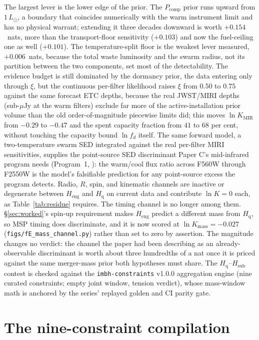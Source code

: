 \documentclass[11pt]{article}
\newcommand{\lnK}{\ensuremath{\ln K}}
\newcommand{\Heng}{\ensuremath{H_{\mathrm{eng}}}}
\newcommand{\Hgas}{\ensuremath{H_{\mathrm{q}}}}
\newcommand{\Hsub}{\ensuremath{H_{\mathrm{sub}}}}
\begin{document}
The largest lever is the lower edge of the prior. The $P_{\mathrm{comp}}$ prior runs upward from $1\,L_{\odot}$, a boundary that coincides numerically with the warm instrument limit and has no physical warrant; extending it three decades downward is worth $+0.154$~nats, more than the transport-floor sensitivity ($+0.103$) and now the fuel-ceiling one as well ($+0.101$). The temperature-split floor is the weakest lever measured, $+0.006$~nats, because the total waste luminosity and the swarm radius, not its partition between the two components, set most of the detectability. The evidence budget is still dominated by the dormancy prior, the data entering only through $\xi$, but the continuous per-filter likelihood raises $\xi$ from $0.50$ to $0.75$ against the same forecast ETC depths, because the real JWST/MIRI depths (sub-$\mu$Jy at the warm filters) exclude far more of the active-installation prior volume than the old order-of-magnitude piecewise limits did; this moves $\lnK_{\mathrm{MIR}}$ from $-0.29$ to $-0.47$ and the spent capacity fraction from $41$ to $68$ per cent, without touching the capacity bound $\ln f_{d}$ itself. The same forward model, a two-temperature swarm SED integrated against the real per-filter MIRI sensitivities, supplies the point-source SED discriminant Paper C's mid-infrared program needs (Program~1, \citealt{Swanson2026Campaign}): the warm/cool flux ratio across F560W through F2550W is the model's falsifiable prediction for any point-source excess the program detects. Radio, $R$, spin, and kinematic channels are inactive or degenerate between \Heng{} and \Hgas{} on current data and contribute $\lnK = 0$ each, as Table~\ref{tab:residue} requires. The timing channel is no longer among them. \S\ref{sec:worked}'s spin-up requirement makes \Heng{} predict a different mass from \Hgas, so MSP timing does discriminate, and it is now scored at $\lnK_{\mathrm{mass}} = -0.027$ (\texttt{figs/fE\_mass\_channel.py}) rather than set to zero by assertion. The magnitude changes no verdict: the channel the paper had been describing as an already-observable discriminant is worth about three hundredths of a nat once it is priced against the same merger-mass prior both hypotheses must share. The \Hgas--\Hsub{} contest is checked against the \texttt{imbh-constraints} v1.0.0 aggregation engine (nine curated constraints; empty joint window, tension verdict), whose mass-window math is anchored by the series' replayed golden and CI parity gate.

\section{The nine-constraint compilation}
\label{app:nine}
\end{document}
